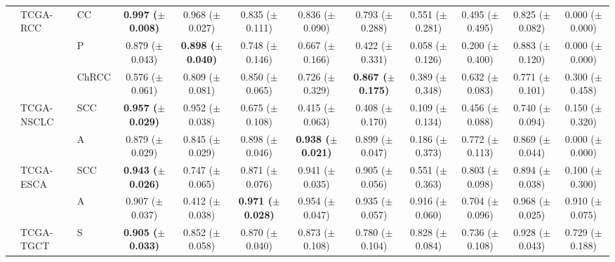 \documentclass[10pt,twocolumn,letterpaper]{article}
\begin{document}
\begin{table}[!ht]
{{\begin{tabular}{lllccccccccc}
                & TCGA-RCC         & CC  & \textbf{0.997 ($\pm$0.008)}  & 0.968 ($\pm$0.027)           & 0.835 ($\pm$0.111)          & 0.836 ($\pm$0.090)          & 0.793 ($\pm$0.288)          & 0.551 ($\pm$0.281)  & 0.495 ($\pm$0.495)          & 0.825 ($\pm$0.082)  & 0.000 ($\pm$0.000)    \\
                &                  & P& 0.879 ($\pm$0.043)           & \textbf{0.898 ($\pm$0.040)}  & 0.748 ($\pm$0.146)          & 0.667 ($\pm$0.166)          & 0.422 ($\pm$0.331)          & 0.058 ($\pm$0.126)  & 0.200 ($\pm$0.400)          & 0.883 ($\pm$0.120)  & 0.000 ($\pm$0.000)    \\
                &                  & ChRCC & 0.576 ($\pm$0.061)           & 0.809 ($\pm$0.081)           & 0.850 ($\pm$0.065)          & 0.726 ($\pm$0.329)          & \textbf{0.867 ($\pm$0.175)} & 0.389 ($\pm$0.348)  & 0.632 ($\pm$0.083)          & 0.771 ($\pm$0.101)  & 0.300 ($\pm$0.458)    \\
                & TCGA-NSCLC       & SCC          & \textbf{0.957 ($\pm$0.029)}  & 0.952 ($\pm$0.038)           & 0.675 ($\pm$0.108)          & 0.415 ($\pm$0.063)          & 0.408 ($\pm$0.170)          & 0.109 ($\pm$0.134)  & 0.456 ($\pm$0.088)          & 0.740 ($\pm$0.094)  & 0.150 ($\pm$0.320)    \\
                &                  & A                   & 0.879 ($\pm$0.029)           & 0.845 ($\pm$0.029)           & 0.898 ($\pm$0.046)          & \textbf{0.938 ($\pm$0.021)} & 0.899 ($\pm$0.047)          & 0.186 ($\pm$0.373)  & 0.772 ($\pm$0.113)          & 0.869 ($\pm$0.044)  & 0.000 ($\pm$0.000)    \\
                & TCGA-ESCA        & SCC          & \textbf{0.943 ($\pm$0.026)}  & 0.747 ($\pm$0.065)           & 0.871 ($\pm$0.076)          & 0.941 ($\pm$0.035)          & 0.905 ($\pm$0.056)          & 0.551 ($\pm$0.363)  & 0.803 ($\pm$0.098)          & 0.894 ($\pm$0.038)  & 0.100 ($\pm$0.300)    \\
                &                  & A                   & 0.907 ($\pm$0.037)           & 0.412 ($\pm$0.038)           & \textbf{0.971 ($\pm$0.028)} & 0.954 ($\pm$0.047)          & 0.935 ($\pm$0.057)          & 0.916 ($\pm$0.060)  & 0.704 ($\pm$0.096)          & 0.968 ($\pm$0.025)  & 0.910 ($\pm$0.075)    \\
                & TCGA-TGCT        & S & \textbf{0.905 ($\pm$0.033)}  & 0.852 ($\pm$0.058)           & 0.870 ($\pm$0.040)          & 0.873 ($\pm$0.108)          & 0.780 ($\pm$0.104)          & 0.828 ($\pm$0.084)  & 0.736 ($\pm$0.108)          & 0.928 ($\pm$0.043)  & 0.729 ($\pm$0.188)    \\

\end{tabular}}}
\end{table}
\end{document}
